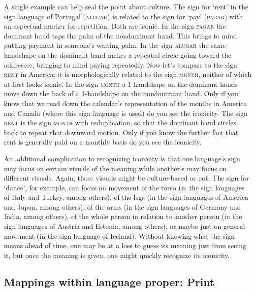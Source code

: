 \documentclass[output=paper,
modfonts
]{LSP/langsci}
\begin{document}
A single example can help seal the point about culture. The sign for
`rent' in the sign language of Portugal (\textsc{alugar}) is related to
the sign for `pay' (\textsc{pagar}) with an aspectual marker for
repetition. Both are iconic. In the sign \textsc{pagar} the dominant
hand taps the palm of the nondominant hand. This brings to mind putting
payment in someone's waiting palm. In the sign \textsc{alugar} the same
handshape on the dominant hand makes a repeated circle going toward the
addressee, bringing to mind paying repeatedly. Now let's compare to the
sign \textsc{rent} in America\textsc{;} it is morphologically related to
the sign \textsc{month,} neither of which at first looks iconic. In the
sign \textsc{month} a 1-handshape on the dominant hands move down the
back of a 1-handshape on the nondominant hand. Only if you know that we
read down the calendar's representation of the months in America and
Canada (where this sign language is used) do you see the iconicity. The
sign \textsc{rent} is the sign \textsc{month} with reduplication, so
that the dominant hand circles back to repeat that downward motion. Only
if you know the further fact that rent is generally paid on a monthly
basis do you see the iconicity.

An additional complication to recognizing iconicity is that one
language's sign may focus on certain visuals of the meaning while
another's may focus on different visuals. Again, those visuals might be
culture-based or not. The sign for `dance', for example, can focus on
movement of the torso (in the sign languages of Italy and Turkey, among
others), of the legs (in the sign languages of America and Japan, among
others), of the arms (in the sign languages of Germany and India, among
others), of the whole person in relation to another person (in the sign
languages of Austria and Estonia, among others), or maybe just on
general movement (in the sign language of Iceland). Without knowing what
the sign means ahead of time, one may be at a loss to guess its meaning
just from seeing it, but once the meaning is given, one might quickly
recognize its iconicity.

\subsection{Mappings within language proper: Print}
\end{document}
